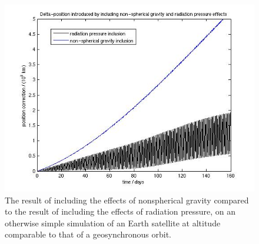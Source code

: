 \begin{description}
     \begin{figure}[!ht]
     \begin{center}
     \includegraphics[width=160mm]{figs/orbital/radiation_effect.jpg}
     \caption{The result of including the effects of nonspherical gravity
     compared to the result of including the effects of radiation
     pressure, on an otherwise simple simulation of an Earth satellite
     at altitude comparable to that of a geosynchronous orbit.}
     \label{fig:ivv_grav_rad_comp}
     \end{center}
     \end{figure}
  \end{description}
%
